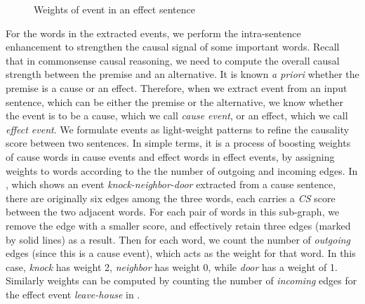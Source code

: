 \begin{figure}[th]
\centering
{}
\caption{Weights of event in an effect sentence}
\label{fig:effectEvent}
\end{figure}

For the words in the extracted events, we perform the intra-sentence
enhancement to strengthen the causal signal of some important words.
Recall that in commonsense causal reasoning, we need to compute the
overall causal strength between the premise and an alternative. It
is known {\em a priori} whether the premise is a cause or an effect.
Therefore, when we extract event from an input sentence, which can
be either the premise or the alternative, we know whether the event
is to be a cause, which we call {\em cause event}, or an effect,
which we call {\em effect event}. We formulate events as
light-weight patterns to refine the causality score between two
sentences. In simple terms, it is a process of boosting weights of
cause words in cause events and effect words in effect events, by
assigning weights to words according to the the number of outgoing
and incoming edges. In , which shows an event
{\em knock-neighbor-door} extracted from a cause sentence, there are
originally six edges among the three words, each carries a \emph{CS}
score between the two adjacent words. For each pair of words in this
sub-graph, we remove the edge with a smaller score, and effectively
retain three edges (marked by solid lines) as a result. Then for
each word, we count the number of {\em outgoing} edges (since this
is a cause event), which acts as the weight for that word. In this
case, {\em knock} has weight 2, {\em neighbor} has weight 0, while
{\em door} has a weight of 1. Similarly weights can be computed by
counting the number of {\em incoming} edges for the effect event
{\em leave-house} in .

